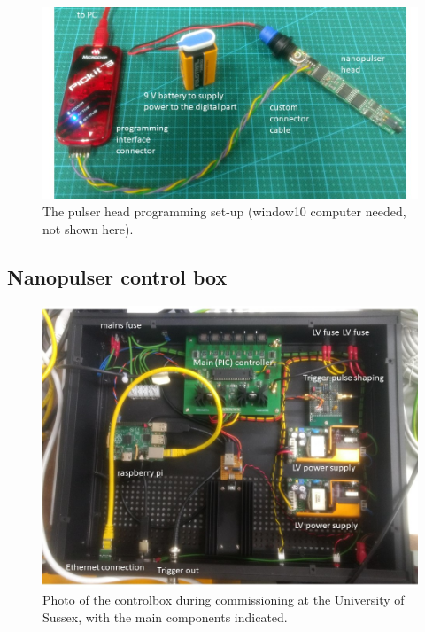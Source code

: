 \begin{figure}
\begin{center}	
  \includegraphics[width=1.0\linewidth]{figures/pulserhead_programming.jpg}
  \caption{The pulser head programming set-up (window10 computer needed, not shown here).}
  \label{figure:pulserhead_programming}
\end{center}
\end{figure}


\subsection*{Nanopulser control box}

\begin{figure}
\begin{center}	
  \includegraphics[width=0.75\linewidth]{figures/controlbox.jpg}
  \caption{Photo of the controlbox during commissioning at the University of Sussex, with the main components indicated.}
  \label{figure:controlbox}
\end{center}
\end{figure}

